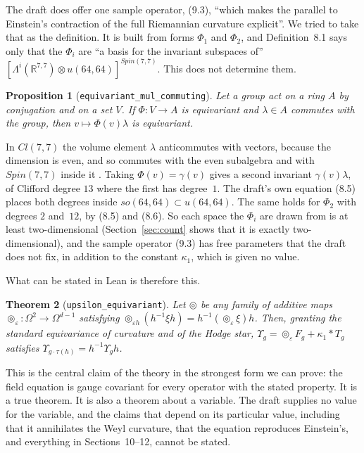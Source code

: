 \documentclass[11pt]{article}
\newtheorem{theorem}{Theorem}
\newtheorem{proposition}[theorem]{Proposition}
\theoremstyle{remark}
\newcommand{\eps}{\varepsilon}
\newcommand{\Sh}{\circledcirc}
\newcommand{\lean}[1]{\texttt{#1}}
\begin{document}
The draft does offer one sample operator, (9.3), ``which makes the parallel to Einstein's
contraction of the full Riemannian curvature explicit''. We tried to take that as the
definition. It is built from forms $\Phi_1$ and $\Phi_2$, and Definition~8.1 says only that the
$\Phi_i$ are ``a basis for the invariant subspaces of''
$[\Lambda^i(\mathbb R^{7,7})\otimes u(64,64)]^{Spin(7,7)}$. This does not determine them.

\begin{proposition}[\lean{equivariant\_mul\_commuting}]
Let a group act on a ring $A$ by conjugation and on a set $V$. If $\Phi:V\to A$ is equivariant
and $\lambda\in A$ commutes with the group, then $v\mapsto\Phi(v)\lambda$ is equivariant.
\end{proposition}

In $Cl(7,7)$ the volume element $\lambda$ anticommutes with vectors, because the dimension is
even, and so commutes with the even subalgebra and with $Spin(7,7)$ inside it
\cite[Chapter~I, Section~3]{LM}. Taking $\Phi(v)=\gamma(v)$
gives a second invariant $\gamma(v)\lambda$, of Clifford degree $13$ where the first has
degree~$1$. The draft's own equation (8.5) places both degrees inside $so(64,64)\subset
u(64,64)$. The same holds for $\Phi_2$ with degrees $2$ and~$12$, by (8.5) and (8.6). So each
space the $\Phi_i$ are drawn from is at least two-dimensional (Section~\ref{sec:count} shows
that it is exactly two-dimensional), and the sample operator (9.3)
has free parameters that the draft does not fix, in addition to the constant $\kappa_1$, which
is given no value.

What can be stated in Lean is therefore this.

\begin{theorem}[\lean{upsilon\_equivariant}]\label{thm:upsilon}
Let $\Sh$ be \emph{any} family of additive maps
$\Sh_\eps:\Omega^2\to\Omega^{d-1}$ satisfying
$\Sh_{\eps h}(h^{-1}\xi h)=h^{-1}(\Sh_\eps\xi)h$. Then, granting the standard equivariance of
curvature and of the Hodge star,
$\Upsilon_g=\Sh_\eps F_g+\kappa_1 *T_g$ satisfies
$\Upsilon_{g\cdot\tau(h)}=h^{-1}\Upsilon_g h$.
\end{theorem}

This is the central claim of the theory in the strongest form we can prove: the field equation
is gauge covariant for every operator with the stated property. It is a true theorem. It is
also a theorem about a variable. The draft supplies no value for the variable, and the claims
that depend on its particular value, including that it annihilates the Weyl curvature, that
the equation reproduces Einstein's, and everything in Sections~10--12, cannot be stated.
\end{document}
